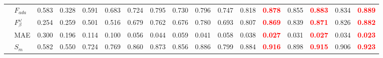 \documentclass[runningheads]{llncs}
\begin{document}
\begin{table}[t]
{\begin{tabular}{@{}rl|ccccccccccc|cc|cc@{}}
    & $F_{ada}$            & 0.583                                     & 0.328                                       & 0.591                                       & 0.683                                  & 0.724                                      & 0.795                                          & 0.730                                      & 0.796                                        & 0.747                                            & 0.818                                      & \textcolor{red}{\textbf{0.878}} & 0.855                                          & \textcolor{red}{\textbf{0.883}} & 0.834                                     & \textcolor{red}{\textbf{0.889}} \\
    & $F_{\beta}^{\omega}$ & 0.254                                     & 0.259                                       & 0.501                                       & 0.516                                  & 0.679                                      & 0.762                                          & 0.676                                      & 0.780                                        & 0.693                                            & 0.807                                      & \textcolor{red}{\textbf{0.869}} & 0.839                                          & \textcolor{red}{\textbf{0.871}} & 0.826                                     & \textcolor{red}{\textbf{0.882}} \\
    & MAE                  & 0.300                                     & 0.196                                       & 0.114                                       & 0.100                                  & 0.056                                      & 0.044                                          & 0.059                                      & 0.041                                        & 0.058                                            & 0.038                                      & \textcolor{red}{\textbf{0.027}} & 0.031                                          & \textcolor{red}{\textbf{0.027}} & 0.034                                     & \textcolor{red}{\textbf{0.023}} \\
    & $S_{m}$              & 0.582                                     & 0.550                                       & 0.724                                       & 0.769                                  & 0.860                                      & 0.873                                          & 0.856                                      & 0.886                                        & 0.799                                            & 0.884                                      & \textcolor{red}{\textbf{0.916}} & 0.898                                          & \textcolor{red}{\textbf{0.915}} & 0.906                                     & \textcolor{red}{\textbf{0.923}} \\

\end{tabular}}
\end{table}
\end{document}
